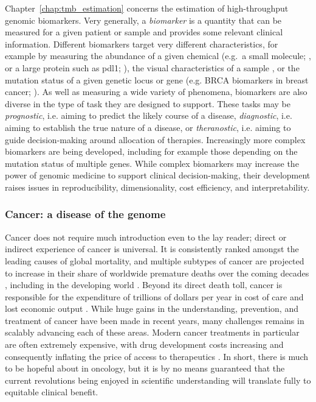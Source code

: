 \documentclass[thesis.tex]{subfiles}
\begin{document}
Chapter~\ref{chap:tmb_estimation} concerns the estimation of high-throughput genomic biomarkers. Very generally, a \emph{biomarker} is a quantity that can be measured for a given patient or sample and provides some relevant clinical information. Different biomarkers target very different characteristics, for example by measuring the abundance of a given chemical (e.g.~a small molecule; \citealp{qiu_small_2023}, or a large protein such as \gls{pdl1}; \citealp{doroshow_pd-l1_2021}), the visual characteristics of a sample \citep{smith_biomarkers_2003}, or the mutation status of a given genetic locus or gene (e.g. BRCA biomarkers in breast cancer; \citealp{walsh_genomic_2016}). As well as measuring a wide variety of phenomena, biomarkers are also diverse in the type of task they are designed to support. These tasks may be \emph{prognostic}, i.e. aiming to predict the likely course of a disease, \emph{diagnostic}, i.e. aiming to establish the true nature of a disease, or \emph{theranostic}, i.e. aiming to guide decision-making around allocation of therapies. Increasingly more complex biomarkers are being developed, including for example those depending on the mutation status of multiple genes. While complex biomarkers may increase the power of genomic medicine to support clinical decision-making, their development raises issues in reproducibility, dimensionality, cost efficiency, and interpretability.

\subsubsection{Cancer: a disease of the genome}
Cancer does not require much introduction even to the lay reader; direct or indirect experience of cancer is universal. It is consistently ranked amongst the leading causes of global mortality, and multiple subtypes of cancer are projected to increase in their share of worldwide premature deaths over the coming decades \citep{mathers_projections_2006}, including in the developing world \citep{kanavos_rising_2006}. Beyond its direct death toll, cancer is responsible for the expenditure of trillions of dollars per year in cost of care and lost economic output \citep{wild_world_2020}. While huge gains in the understanding, prevention, and treatment of cancer have been made in recent years, many challenges remains in scalably advancing each of these areas. Modern cancer treatments in particular are often extremely expensive, with drug development costs increasing and consequently inflating the price of access to therapeutics \citep{howard_pricing_2015}. In short, there is much to be hopeful about in oncology, but it is by no means guaranteed that the current revolutions being enjoyed in scientific understanding will translate fully to equitable clinical benefit.
\end{document}
